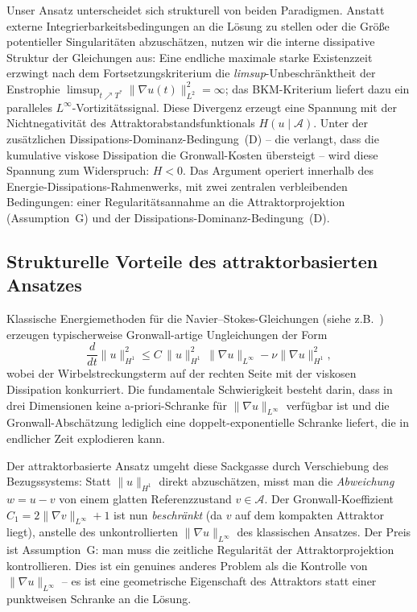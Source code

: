 \documentclass[12pt,a4paper]{article}
\theoremstyle{definition}
\theoremstyle{plain}
\theoremstyle{remark}
\begin{document}
Unser Ansatz unterscheidet sich strukturell von beiden Paradigmen. Anstatt externe Integrierbarkeitsbedingungen an die Lösung zu stellen oder die Größe potentieller Singularitäten abzuschätzen, nutzen wir die interne dissipative Struktur der Gleichungen aus: Eine endliche maximale starke Existenzzeit erzwingt nach dem Fortsetzungskriterium die \emph{limsup}-Unbeschränktheit der Enstrophie $\limsup_{t\nearrow T^*}\|\nabla u(t)\|_{L^2}^2 = \infty$; das BKM-Kriterium liefert dazu ein paralleles $L^\infty$-Vortizitätssignal. Diese Divergenz erzeugt eine Spannung mit der Nichtnegativität des Attraktorabstandsfunktionals $H(u \mid \mathcal{A})$. Unter der zusätzlichen Dissipations-Dominanz-Bedingung~(D) -- die verlangt, dass die kumulative viskose Dissipation die Gronwall-Kosten übersteigt -- wird diese Spannung zum Widerspruch: $H < 0$. Das Argument operiert innerhalb des Energie-Dissipations-Rahmenwerks, mit zwei zentralen verbleibenden Bedingungen: einer Regularitätsannahme an die Attraktorprojektion (Assumption~G) und der Dissipations-Dominanz-Bedingung~(D).

\subsection{Strukturelle Vorteile des attraktorbasierten Ansatzes}

Klassische Energiemethoden für die Navier--Stokes-Gleichungen (siehe z.B.\ \cite{ConstantinFoias1988,Temam2001}) erzeugen typischerweise Gronwall-artige Ungleichungen der Form
\[
    \frac{d}{dt}\|u\|_{H^1}^2 \le C\,\|u\|_{H^1}^2\,\|\nabla u\|_{L^\infty} - \nu\|\nabla u\|_{H^1}^2,
\]
wobei der Wirbelstreckungsterm auf der rechten Seite mit der viskosen Dissipation konkurriert. Die fundamentale Schwierigkeit besteht darin, dass in drei Dimensionen keine a-priori-Schranke für $\|\nabla u\|_{L^\infty}$ verfügbar ist und die Gronwall-Abschätzung lediglich eine doppelt-exponentielle Schranke liefert, die in endlicher Zeit explodieren kann.

Der attraktorbasierte Ansatz umgeht diese Sackgasse durch Verschiebung des Bezugssystems: Statt $\|u\|_{H^1}$ direkt abzuschätzen, misst man die \emph{Abweichung} $w = u - v$ von einem glatten Referenzzustand $v \in \mathcal{A}$. Der Gronwall-Koeffizient $C_1 = 2\|\nabla v\|_{L^\infty} + 1$ ist nun \emph{beschränkt} (da $v$ auf dem kompakten Attraktor liegt), anstelle des unkontrollierten $\|\nabla u\|_{L^\infty}$ des klassischen Ansatzes. Der Preis ist Assumption~G: man muss die zeitliche Regularität der Attraktorprojektion kontrollieren. Dies ist ein genuines anderes Problem als die Kontrolle von $\|\nabla u\|_{L^\infty}$ -- es ist eine geometrische Eigenschaft des Attraktors statt einer punktweisen Schranke an die Lösung.
\end{document}

